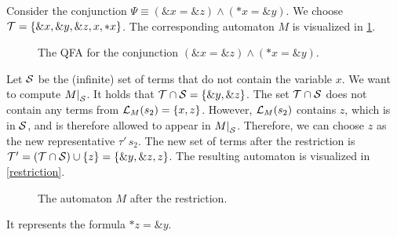 \begin{example}
    Consider the conjunction $\Psi \equiv (\&x = \&z) \land (*x = \&y)$.
    We choose $\mathcal{T} = \{\&x, \&y, \&z, x, *x\}$. The corresponding automaton $M$ is visualized in \cref{fig:psi-rest}.
    \begin{figure}
        \centering
        \caption{The QFA for the conjunction $(\&x = \&z) \land (*x = \&y)$.}\label{fig:psi-rest}
    \end{figure}
    Let $\mathcal{S}$ be the (infinite) set of terms that do not contain the variable $x$.
    We want to compute $\restr{M}{\Set}$.
    It holds that $\mathcal{T} \cap \mathcal{S} = \{\&y, \&z\}$.
    The set $\mathcal{T} \cap \mathcal{S}$ does
    not contain any terms from $\mathcal{L}_{M}(s_2) = \{x,z\}$.
    However, $\mathcal{L}_{M}(s_2)$ contains $z$, which is in $\mathcal{S}$, and is therefore allowed to appear in $\restr{M}{\Set}$.
    Therefore, we can choose $z$ as the new representative $\tau'\,s_2$.
    The new set of terms after the restriction is $\mathcal{T}' = (\mathcal{T} \cap \mathcal{S}) \cup \{z\} = \{\&y, \&z, z\}$.
    The resulting automaton is visualized in \cref{restriction}.
    \begin{figure}
        \centering
        \caption{The automaton $M$ after the restriction.}\label{fig:restriction}
    \end{figure}
    It represents the formula $*z = \&y$.
\end{example}

